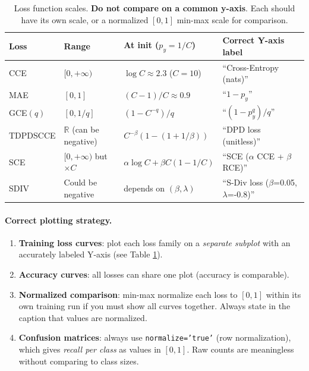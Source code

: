 \documentclass[11pt,a4paper]{article}
\newcommand{\R}{\mathbb{R}}
\begin{document}
\begin{table}[h]
\centering\small
\begin{tabular}{@{}lllp{5cm}@{}}
\toprule
\textbf{Loss} & \textbf{Range} & \textbf{At init ($p_y=1/C$)} & \textbf{Correct Y-axis label} \\
\midrule
CCE    & $[0, +\infty)$ & $\log C \approx 2.3$ ($C=10$)         & ``Cross-Entropy (nats)'' \\
MAE    & $[0, 1]$       & $(C-1)/C \approx 0.9$                 & ``$1 - p_y$'' \\
GCE$(q)$ & $[0, 1/q]$   & $(1-C^{-q})/q$                       & ``$(1-p_y^q)/q$'' \\
TDPDSCCE & $\R$ (can be negative) & $C^{-\beta}(1 - (1+1/\beta))$  & ``DPD loss (unitless)'' \\
SCE    & $[0, +\infty)$ but $\times C$ & $\alpha\log C + \beta C (1-1/C)$ & ``SCE ($\alpha$ CCE + $\beta$ RCE)'' \\
SDIV   & Could be negative & depends on $(\beta,\lambda)$ & ``S-Div loss ($\beta$=0.05, $\lambda$=-0.8)'' \\
\bottomrule
\end{tabular}
\caption{Loss function scales. \textbf{Do not compare on a common y-axis}.
Each should have its own scale, or a normalized $[0,1]$ min-max scale for comparison.}
\label{tab:scales}
\end{table}

\paragraph{Correct plotting strategy.}
\begin{enumerate}
  \item \textbf{Training loss curves}: plot each loss family on a \emph{separate subplot}
  with an accurately labeled Y-axis (see Table \ref{tab:scales}).
  \item \textbf{Accuracy curves}: all losses can share one plot (accuracy is comparable).
  \item \textbf{Normalized comparison}: min-max normalize each loss to $[0,1]$ within
  its own training run if you must show all curves together. Always state in the caption
  that values are normalized.
  \item \textbf{Confusion matrices}: always use \texttt{normalize='true'} (row normalization),
  which gives \emph{recall per class} as values in $[0,1]$. Raw counts are meaningless
  without comparing to class sizes.
\end{enumerate}
\end{document}
